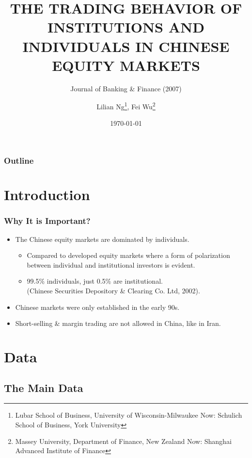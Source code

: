 \documentclass{beamer}
\title[Ng, Wu (2007)]{\MakeUppercase{The trading behavior of institutions and individuals in Chinese equity markets}}
\subtitle{Journal of Banking \& Finance (2007)}
\author[Mahdi Mir]{Lilian Ng\texorpdfstring{\footnote{Lubar School of Business, University of Wisconsin-Milwaukee \newline Now: Schulich School of Business, York University}}{}, Fei Wu\texorpdfstring{\footnote{Massey University, Department of Finance, New Zealand \newline Now: Shanghai Advanced Institute of Finance}}{}}
\date[TeIAS]{\today}
\begin{document}
\begin{frame}
    \titlepage{}
\end{frame}

\begin{frame}[label=outl]
    \frametitle{Outline}
    \tableofcontents{}
\end{frame}


\section{Introduction}

\begin{frame}
    \frametitle{Why It is Important?}
    \begin{itemize}
        \item The Chinese equity markets are dominated by individuals.
              \begin{itemize}
                  \item Compared to developed equity markets where a form of polarization between individual and institutional investors is evident.
                  \item 99.5\% individuals, just 0.5\% are institutional. \\ (Chinese Securities Depository \& Clearing Co. Ltd, 2002).
              \end{itemize}
        \item Chinese markets were only established in the early 90s.
        \item Short-selling \& margin trading are not allowed in China, like in Iran.
    \end{itemize}
\end{frame}


\section{Data}


\subsection*{The Main Data}
\end{document}
